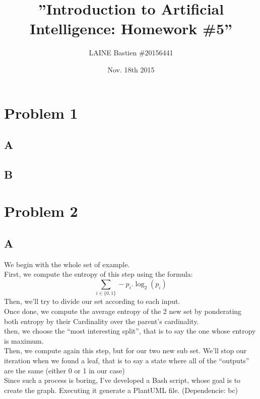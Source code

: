 \documentclass{article}
\begin{document}
\title{\textbf{''Introduction to Artificial Intelligence: Homework \#5''}}
\author{LAINE Bastien \#20156441}
\date{Nov. 18th 2015}
\maketitle
\tableofcontents

\newpage
    \section{Problem 1}
        \subsection{A}
        \subsection{B}
    \section{Problem 2}
        \subsection{A}
            We begin with the whole set of example.\\
            First, we compute the entropy of this step using the formula:
            \[
                \sum_{i\in\{0, 1\}} -p_i.\log_2(p_i)
            \]
            Then, we'll try to divide our set according to each input.\\
            Once done, we compute the average entropy of the 2 new set by ponderating both entropy by their Cardinality over the parent's cardinality.\\
            then, we choose the ``most interesting split'', that is to say the one whose entropy is maximum.\\

            Then, we compute again this step, but for our two new sub set. We'll stop our iteration when we found a leaf, that is to say a state where all of the ``outputs'' are the same (either 0 or 1 in our case)\\
            Since such a process is boring, I've developed a Bash script, whose goal is to create the graph. Executing it generate a PlantUML file. (Dependencie: bc)\\
\end{document}
